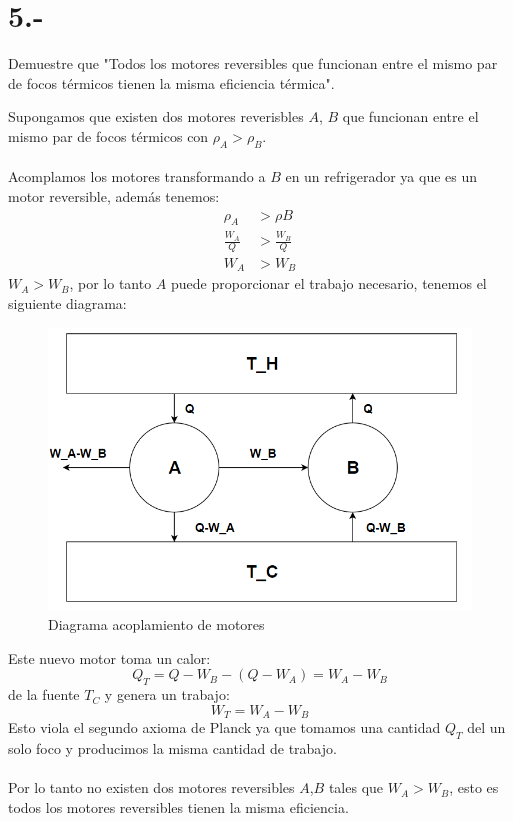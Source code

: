 \documentclass{article}
\begin{document}
\section*{5.-}
Demuestre que "Todos los motores reversibles que funcionan entre el mismo 
par de focos térmicos tienen la misma eficiencia térmica".
\begin{tcolorbox}[breakable]
    Supongamos que existen dos motores reverisbles $A$, $B$ que funcionan entre el mismo 
    par de focos térmicos con $\rho_A > \rho_B$. \\ \\
    Acomplamos los motores transformando a $B$ en un refrigerador ya que es un motor reversible, 
    además tenemos:
    \begin{align*}
        \rho_A &> \rho B \\
        \frac{W_A}{Q} &> \frac{W_B}{Q} \\
        W_A &> W_B
    \end{align*}
    $W_A > W_B$, por lo tanto $A$ puede proporcionar el trabajo necesario,
    tenemos el siguiente diagrama:  
    \begin{figure}[H]
        \centering
        \includegraphics[scale=0.5]{images/p5_diagram.png}
        \caption{Diagrama acoplamiento de motores}
        \label{}
    \end{figure}
    Este nuevo motor toma un calor:
    \[ Q_T = Q-W_B-(Q-W_A) = W_A - W_B \]
    de la fuente $T_C$ y genera un trabajo: 
    \[ W_T = W_A-W_B \]
    Esto viola el segundo axioma de Planck ya que tomamos una cantidad $Q_T$ del un solo foco
    y producimos la misma cantidad de trabajo. \\ \\
    Por lo tanto no existen dos motores reversibles $A$,$B$ tales que $W_A > W_B$, esto es 
    todos los motores reversibles tienen la misma eficiencia.
\end{tcolorbox}
\end{document}
